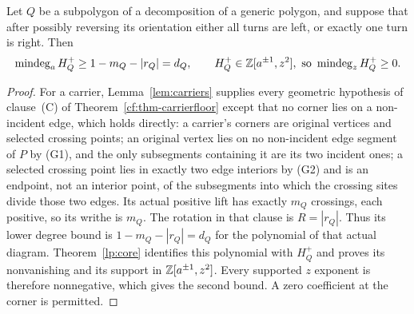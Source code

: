 \begin{theorem}\label{thm:floor}
Let $Q$ be a subpolygon of a decomposition of a generic polygon, and suppose
that after possibly reversing its orientation either all turns are left, or
exactly one turn is right. Then
\[
\operatorname{mindeg}_a H^+_Q\geq 1-m_Q-|r_Q|=d_Q,\qquad
H^+_Q\in\mathbb Z[a^{\pm1},z^2],\ \text{so }\operatorname{mindeg}_zH^+_Q\geq0.
\]
\end{theorem}
\begin{proof}
For a carrier, Lemma~\ref{lem:carriers} supplies every geometric
hypothesis of clause~(C) of Theorem~\ref{cf:thm-carrierfloor} except that
no corner lies on a non-incident edge, which holds directly: a carrier's
corners are original vertices and selected crossing points; an original
vertex lies on no non-incident edge segment of $P$ by (G1), and the only
subsegments containing it are its two incident ones; a selected crossing
point lies in exactly two edge interiors by (G2) and is an endpoint, not an
interior point, of the subsegments into which the crossing sites divide
those two edges. Its actual positive
lift has exactly $m_Q$ crossings, each positive, so its writhe is $m_Q$.
The rotation in that clause is $R=|r_Q|$. Thus its lower degree bound is
$1-m_Q-|r_Q|=d_Q$ for the polynomial of that actual diagram.
Theorem~\ref{lp:core} identifies this polynomial with $H_Q^+$ and proves
its nonvanishing and its support in $\mathbb Z[a^{\pm1},z^2]$.
Every supported $z$ exponent is therefore nonnegative, which gives the
second bound. A zero coefficient at the corner is permitted.
\end{proof}


